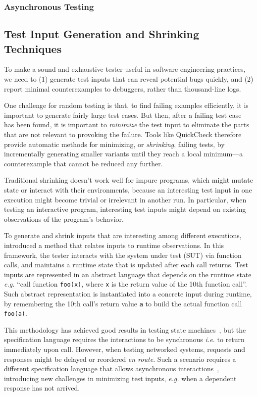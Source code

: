 \documentclass{article}
\newcommand{\ilc}[1]{\lstinline[style=customcoq]{#1}}
\theoremstyle{definition}
\begin{document}
\subsubsection{Asynchronous Testing}

\subsection{Test Input Generation and Shrinking Techniques}
\label{sec:harness}
To make a sound and exhaustive tester useful in software engineering practices,
we need to (1) generate test inputs that can reveal potential bugs quickly, and
(2) report minimal counterexamples to debuggers, rather than thousand-line logs.

One challenge for random testing is that, to find failing examples efficiently,
it is important to generate fairly large test cases.  But then, after a failing
test case has been found, it is important to \textit{minimize} the test input to
eliminate the parts that are not relevant to provoking the failure.  Tools like
QuickCheck therefore provide automatic methods for minimizing, or {\em
  shrinking}, failing tests, by incrementally generating smaller variants until
they reach a local minimum---a counterexample that cannot be reduced any
further.

Traditional shrinking doesn't work well for impure programs, which might mutate
state or interact with their environments, because an interesting test input in
one execution might become trivial or irrelevant in another run.  In particular,
when testing an interactive program, interesting test inputs might depend on
existing observations of the program's behavior.

To generate and shrink inputs that are interesting among different executions,
\textcite{Hughes2007} introduced a method that relates inputs to runtime
observations.  In this framework, the tester interacts with the system under
test (SUT) via function calls, and maintains a runtime state that is updated
after each call returns.  Test inputs are represented in an abstract language
that depends on the runtime state {\it e.g.} ``call function \ilc{foo(x)}, where
\ilc{x} is the return value of the 10th function call''.  Such abstract
representation is instantiated into a concrete input during runtime, by
remembering the 10th call's return value \ilc{a} to build the actual function
call \ilc{foo(a)}.

This methodology has achieved good results in testing state
machines~\cite{Hughes2016}, but the specification language requires the
interactions to be synchronous {\it i.e.} to return immediately upon call.
However, when testing networked systems, requests and responses might be delayed
or reordered \textit{en route}.  Such a scenario requires a different
specification language that allows asynchronous
interactions~\cite{li2021modelbased}, introducing new challenges in minimizing
test inputs, {\it e.g.} when a dependent response has not arrived.
\end{document}
